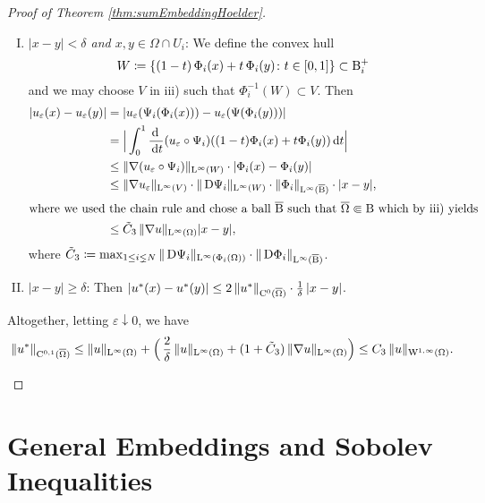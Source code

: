 \begin{proof}[Proof of Theorem \ref{thm:sumEmbeddingHoelder}]
\begin{enumerate}[i)]
\begin{enumerate}[I)]
        \item \emph{$|x - y| < \delta$ and $x,y \in \Omega \cap U_i$}:
          We define the convex hull $$W \coloneqq \{ (1 - t)\, \Phi_i(x) + t \,\Phi_i(y) \colon t \in [0,1]\} \subset \mathrm{B}_i^+$$ and we may choose $V$ in iii) such that $\Phi_i^{-1}(W) \subset V$.
          Then
          \begin{align*}
            |u_\varepsilon(x) - u_\varepsilon(y)|
            &= |u_\varepsilon(\Psi_i(\Phi_i(x))) - u_\varepsilon(\Psi(\Phi_i(y)))| \\
            &= \Big| \int_0^1 \frac{\, {\operatorname{d}\!{\ }}}{\, {\operatorname{d}\!{t}}} (u_\varepsilon \circ \Psi_i)((1 - t)\Phi_i(x) + t\Phi_i(y)) \, {\operatorname{d}\!{t}} \Big| \\
            &\leq \| \nabla(u_\varepsilon \circ \Psi_i)\|_{\mathrm{L}^\infty(W)} \cdot |\Phi_i(x) - \Phi_i(y)| \\
            &\leq \| \nabla u_\varepsilon \|_{\mathrm{L}^\infty(V)} \cdot \|\,{\operatorname{D}} \Psi_i\|_{\mathrm{L}^\infty(W)} \cdot \|\Phi_i\|_{\mathrm{L}^\infty(\overline {\mathrm{B}})} \cdot |x - y|, \\
            \intertext{where we used the chain rule and chose a ball $\overline{\mathrm{B}}$ such that $\overline \Omega \Subset \mathrm{B}$ which by iii) yields}
            &\leq \tilde C_3 \, \|\nabla u\|_{\mathrm{L}^\infty(\Omega)} | x - y |,
          \end{align*}
          where $\tilde C_3 \coloneqq \max_{1\leq i \lneq N} \|\,{\operatorname{D}} \Psi_i \|_{\mathrm{L}^\infty(\Phi_i(\Omega))} \cdot \| \,{\operatorname{D}} \Phi_i \|_{\mathrm{L}^\infty(\overline {\mathrm{B}})}$.

        \item $|x - y| \geq \delta$:
          Then 
          $|u^*(x) - u^*(y)| \leq 2 \, \|u^*\|_{\mathrm{C}^0(\overline\Omega)} \cdot \frac{1}{\delta}\, |x - y|$.
      \end{enumerate}
      Altogether, letting $\varepsilon \downarrow 0$, we have 
      $$
      \|u^*\|_{\mathrm{C}^{0,1}(\overline\Omega)} 
      \leq \|u\|_{\mathrm{L}^\infty(\Omega)} + \Big( \, \frac{2}{\delta}\, \|u\|_{\mathrm{L}^\infty(\Omega)} + (1 + \tilde C_3 )\, \|\nabla u\|_{\mathrm{L}^\infty(\Omega)} \Big) 
      \leq C_3 \, \|u\|_{\mathrm{W}^{1,\infty}(\Omega)}.\qedhere$$ 
  \end{enumerate}
\end{proof}

\section{General Embeddings and Sobolev Inequalities}




